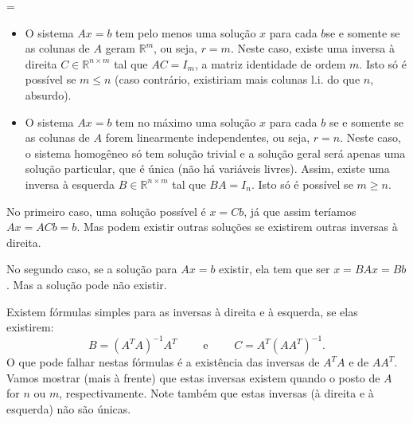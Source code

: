 \begin{center}
     = 
\end{center}

\begin{itemize}
    \item O sistema $Ax=b$ tem pelo menos uma solução $x$ para cada $b$se e somente se as colunas de $A$ geram ${\mathbb{R}}^m$, ou seja, $r=m$. Neste caso, existe uma inversa à direita $C\in {\mathbb{R}}^{n\times m}$ tal que $AC=I_m$, a matriz identidade de ordem $m$. Isto só é possível se $m\leq n$ (caso contrário, existiriam mais colunas l.i. do que $n$, absurdo).
    \item O sistema $Ax=b$ tem no máximo uma solução $x$ para cada $b$ se e somente se as colunas de $A$ forem linearmente independentes, ou seja, $r=n$. Neste caso, o sistema homogêneo só tem solução trivial e a solução geral será apenas uma solução particular, que é única (não há variáveis livres). Assim, existe uma inversa à esquerda $B \in {\mathbb{R}}^{n\times m}$ tal que $BA=I_n$. Isto só é possível se $m\geq n$.
\end{itemize}

No primeiro caso, uma solução possível é $x=Cb$, já que assim teríamos $Ax=ACb=b$. Mas podem existir outras soluções se existirem outras inversas à direita.

No segundo caso, se a solução para $Ax=b$ existir, ela tem que ser $x=BAx=Bb$. Mas a solução pode não existir.

Existem fórmulas simples para as inversas à direita e à esquerda, se elas existirem:
\begin{equation*}
    B=(A^TA)^{-1}A^T \qquad \mbox{ e } \qquad C = A^T(AA^T)^{-1}.
\end{equation*}
O que pode falhar nestas fórmulas é a existência das inversas de $A^TA$ e de $AA^T$. Vamos mostrar (mais à frente) que estas inversas existem quando o posto de $A$ for $n$ ou $m$, respectivamente. Note também que estas inversas (à direita e à esquerda) não são únicas.

